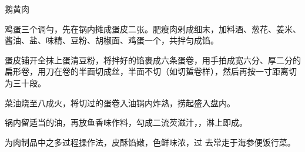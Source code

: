 \begin{recipe}{鹅黄肉}

\ingredients


\cooking

\step 鸡蛋三个调勻，先在锅内摊成蛋皮二张。肥瘦肉剁成细末，加料酒、葱花、姜米、酱油、盐、味精、豆粉、胡椒面、鸡蛋一个，共拌匀成馅。

\step 蛋皮铺开全抹上蛋清豆粉，将拌好的馅裹成六条蛋卷，用手拍成宽六分、厚二分的扁形卷，用刀在卷的半面切成丝，半面不切（如切蜇卷样），然后再按一寸距离切为三十段。

\step 菜油烧至八成火，将切过的蛋卷入油锅内炸熟，捞起盛入盘内。

\step 锅内留适当的油，再放鱼香味作料，勾成二流芡滋汁，，淋上即成。

\notes

为肉制品中之多过程操作法，皮酥馅嫩，色鲜味浓，过 去常走于海参便饭行菜。

\end{recipe}

